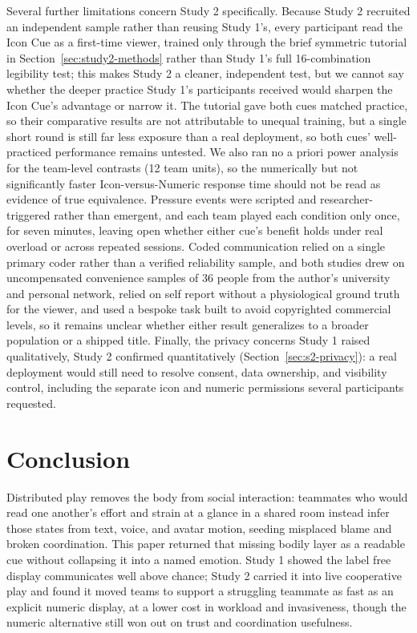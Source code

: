 \documentclass[manuscript,review,anonymous]{acmart}
\begin{document}
Several further limitations concern Study 2 specifically. Because Study 2 recruited an independent sample rather than reusing Study 1's, every participant read the Icon Cue as a first-time viewer, trained only through the brief symmetric tutorial in Section~\ref{sec:study2-methods} rather than Study 1's full 16-combination legibility test; this makes Study 2 a cleaner, independent test, but we cannot say whether the deeper practice Study 1's participants received would sharpen the Icon Cue's advantage or narrow it. The tutorial gave both cues matched practice, so their comparative results are not attributable to unequal training, but a single short round is still far less exposure than a real deployment, so both cues' well-practiced performance remains untested. We also ran no a priori power analysis for the team-level contrasts (12 team units), so the numerically but not significantly faster Icon-versus-Numeric response time should not be read as evidence of true equivalence. Pressure events were scripted and researcher-triggered rather than emergent, and each team played each condition only once, for seven minutes, leaving open whether either cue's benefit holds under real overload or across repeated sessions. Coded communication relied on a single primary coder rather than a verified reliability sample, and both studies drew on uncompensated convenience samples of 36 people from the author's university and personal network, relied on self report without a physiological ground truth for the viewer, and used a bespoke task built to avoid copyrighted commercial levels, so it remains unclear whether either result generalizes to a broader population or a shipped title. Finally, the privacy concerns Study 1 raised qualitatively, Study 2 confirmed quantitatively (Section~\ref{sec:s2-privacy}): a real deployment would still need to resolve consent, data ownership, and visibility control, including the separate icon and numeric permissions several participants requested.

\section{Conclusion}
Distributed play removes the body from social interaction: teammates who would read one another's effort and strain at a glance in a shared room instead infer those states from text, voice, and avatar motion, seeding misplaced blame and broken coordination. This paper returned that missing bodily layer as a readable cue without collapsing it into a named emotion. Study 1 showed the label free display communicates well above chance; Study 2 carried it into live cooperative play and found it moved teams to support a struggling teammate as fast as an explicit numeric display, at a lower cost in workload and invasiveness, though the numeric alternative still won out on trust and coordination usefulness.
\end{document}
